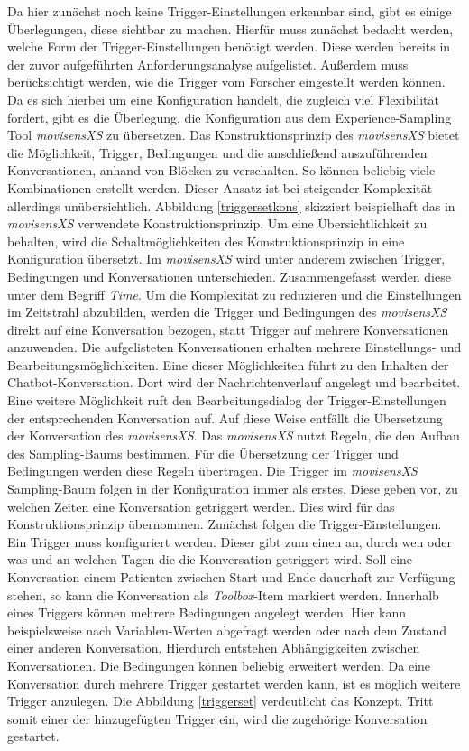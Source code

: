 Da hier zunächst noch keine Trigger-Einstellungen erkennbar sind, gibt es einige Überlegungen, diese sichtbar zu machen. Hierfür muss zunächst bedacht werden, welche Form der Trigger-Einstellungen benötigt werden. Diese werden bereits in der zuvor aufgeführten Anforderungsanalyse aufgelistet. Außerdem muss berücksichtigt werden, wie die Trigger vom Forscher eingestellt werden können. Da es sich hierbei um eine Konfiguration handelt, die zugleich viel Flexibilität fordert, gibt es die Überlegung, die Konfiguration aus dem Experience-Sampling Tool \emph{movisensXS} zu übersetzen. Das Konstruktionsprinzip des \emph{movisensXS} bietet die Möglichkeit, Trigger, Bedingungen und die anschließend auszuführenden Konversationen, anhand von Blöcken zu verschalten. So können beliebig viele Kombinationen erstellt werden. Dieser Ansatz ist bei steigender Komplexität allerdings unübersichtlich. Abbildung \ref{triggersetkons} skizziert beispielhaft das in \emph{movisensXS} verwendete Konstruktionsprinzip. Um eine Übersichtlichkeit zu behalten, wird die Schaltmöglichkeiten des Konstruktionsprinzip in eine Konfiguration übersetzt. Im \emph{movisensXS} wird unter anderem zwischen Trigger, Bedingungen und Konversationen unterschieden. Zusammengefasst werden diese unter dem Begriff \emph{Time}. Um die Komplexität zu reduzieren und die Einstellungen im Zeitstrahl abzubilden, werden die Trigger und Bedingungen des \emph{movisensXS} direkt auf eine Konversation bezogen, statt Trigger auf mehrere Konversationen anzuwenden. Die aufgelisteten Konversationen erhalten mehrere Einstellungs- und Bearbeitungsmöglichkeiten. Eine dieser Möglichkeiten führt zu den Inhalten der Chatbot-Konversation. Dort wird der Nachrichtenverlauf angelegt und bearbeitet. Eine weitere Möglichkeit ruft den Bearbeitungsdialog der Trigger-Einstellungen der entsprechenden Konversation auf. Auf diese Weise entfällt die Übersetzung der Konversation des \emph{movisensXS}. Das \emph{movisensXS} nutzt Regeln, die den Aufbau des Sampling-Baums bestimmen. Für die Übersetzung der Trigger und Bedingungen werden diese Regeln übertragen. Die Trigger im \emph{movisensXS} Sampling-Baum folgen in der Konfiguration immer als erstes. Diese geben vor, zu welchen Zeiten eine Konversation getriggert werden. Dies wird für das Konstruktionsprinzip übernommen. Zunächst folgen die Trigger-Einstellungen. Ein Trigger muss konfiguriert werden. Dieser gibt zum einen an, durch wen oder was und an welchen Tagen die die Konversation getriggert wird. Soll eine Konversation einem Patienten zwischen Start und Ende dauerhaft zur Verfügung stehen, so kann die Konversation als \emph{Toolbox}-Item markiert werden.  Innerhalb eines Triggers können mehrere Bedingungen angelegt werden. Hier kann beispielsweise nach Variablen-Werten abgefragt werden oder nach dem Zustand einer anderen Konversation. Hierdurch entstehen Abhängigkeiten zwischen Konversationen. Die Bedingungen können beliebig erweitert werden. Da eine Konversation durch mehrere Trigger gestartet werden kann, ist es möglich weitere Trigger anzulegen. Die Abbildung \ref{triggerset} verdeutlicht das Konzept. Tritt somit einer der hinzugefügten Trigger ein, wird die zugehörige Konversation gestartet.

